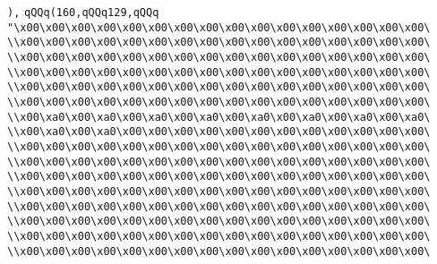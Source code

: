 \verb|),|\newline
\verb|qQQq(160,qQQq129,qQQq|\newline
\verb|"\x00\x00\x00\x00\x00\x00\x00\x00\x00\x00\x00\x00\x00\x00\x00\x00\|\newline
\verb|\\x00\x00\x00\x00\x00\x00\x00\x00\x00\x00\x00\x00\x00\x00\x00\x00\|\newline
\verb|\\x00\x00\x00\x00\x00\x00\x00\x00\x00\x00\x00\x00\x00\x00\x00\x00\|\newline
\verb|\\x00\x00\x00\x00\x00\x00\x00\x00\x00\x00\x00\x00\x00\x00\x00\x00\|\newline
\verb|\\x00\x00\x00\x00\x00\x00\x00\x00\x00\x00\x00\x00\x00\x00\x00\x00\|\newline
\verb|\\x00\x00\x00\x00\x00\x00\x00\x00\x00\x00\x00\x00\x00\x00\x00\x00\|\newline
\verb|\\x00\xa0\x00\xa0\x00\xa0\x00\xa0\x00\xa0\x00\xa0\x00\xa0\x00\xa0\|\newline
\verb|\\x00\xa0\x00\xa0\x00\x00\x00\x00\x00\x00\x00\x00\x00\x00\x00\x00\|\newline
\verb|\\x00\x00\x00\x00\x00\x00\x00\x00\x00\x00\x00\x00\x00\x00\x00\x00\|\newline
\verb|\\x00\x00\x00\x00\x00\x00\x00\x00\x00\x00\x00\x00\x00\x00\x00\x00\|\newline
\verb|\\x00\x00\x00\x00\x00\x00\x00\x00\x00\x00\x00\x00\x00\x00\x00\x00\|\newline
\verb|\\x00\x00\x00\x00\x00\x00\x00\x00\x00\x00\x00\x00\x00\x00\x00\x00\|\newline
\verb|\\x00\x00\x00\x00\x00\x00\x00\x00\x00\x00\x00\x00\x00\x00\x00\x00\|\newline
\verb|\\x00\x00\x00\x00\x00\x00\x00\x00\x00\x00\x00\x00\x00\x00\x00\x00\|\newline
\verb|\\x00\x00\x00\x00\x00\x00\x00\x00\x00\x00\x00\x00\x00\x00\x00\x00\|\newline
\verb|\\x00\x00\x00\x00\x00\x00\x00\x00\x00\x00\x00\x00\x00\x00\x00\x00\|\newline
